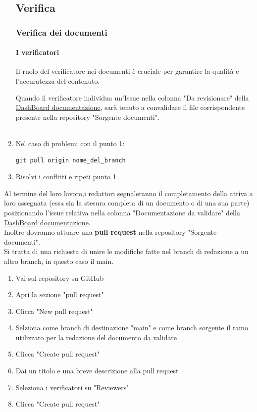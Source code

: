 \documentclass{article}
\begin{document}
\begin{enumerate}
\subsection{Verifica}\label{sec:verifica}
\subsubsection{Verifica dei documenti}
\paragraph{I verificatori}\label{sec:verificatori}

Il ruolo del verificatore nei documenti è cruciale per garantire la qualità e l'accuratezza del contenuto.

Quando il verificatore individua un'Issue nella colonna "Da revisionare" della  \href{https://github.com/orgs/ByteOps-swe/projects/1/views/1}{DashBoard documentazione}, sarà tenuto a convalidare il file corrispondente presente nella repository "Sorgente documenti". \\
=======
        \item Nel caso di problemi con il punto 1:
        \begin{lstlisting}[style=code]
   git pull origin nome_del_branch
        \end{lstlisting}
        \item Risolvi i conflitti e ripeti punto 1.
    \end{enumerate}
\vspace{0.3cm}
    Al termine del loro lavoro,i redattori segnaleranno il completamento della attiva a loro assegnata (essa sia la stesura completa di un documento o di una sua parte) posizionando l'issue relativa nella colonna "Documentazione da validare" della  \href{https://github.com/orgs/ByteOps-swe/projects/1/views/1}{DashBoard documentazione}.\\
    Inoltre dovranno attuare una \textbf{pull request} nella repository "Sorgente documenti".\\
    Si tratta di una richiesta di unire le modifiche fatte nel branch di redazione a un altro branch, in questo caso il main.
    \begin{enumerate}
        \item Vai sul repository su GitHub
        \item Apri la sezione "pull request"
        \item Clicca "New pull request"
        \item Selziona come branch di destinazione "main" e come branch sorgente il ramo utilizzato per la redazione del documento da validare
        \item Clicca "Create pull request"
        \item Dai un titolo e una breve descrizione alla pull request
        \item Seleziona i verificatori su "Reviewers"
        \item Clicca "Create pull request"
    \end{enumerate}
    
\end{document}
